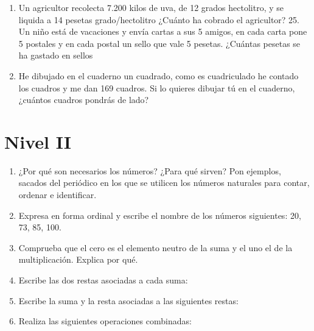 \documentclass[twoside]{article}
\begin{document}
\begin{enumerate}
\item Un agricultor recolecta 7.200 kilos de uva, de 12 grados hectolitro, y se liquida a 14 pesetas grado/hectolitro ¿Cuánto ha cobrado el agricultor? 25. Un niño está de vacaciones y envía cartas a sus 5 amigos, en cada carta pone 5 postales y en cada postal un sello que vale 5 pesetas. ¿Cuántas pesetas se ha gastado en sellos
\item He dibujado en el cuaderno un cuadrado, como es cuadriculado he contado los cuadros y me dan 169 cuadros. Si lo quieres dibujar tú en el cuaderno, ¿cuántos cuadros
pondrás de lado?
\end{enumerate}
\section*{Nivel II}
\begin{enumerate}
\item ¿Por qué son necesarios los números? ¿Para qué sirven? Pon ejemplos, sacados del periódico en los que se utilicen los números naturales para contar, ordenar e identificar.
\item Expresa en forma ordinal y escribe el nombre de los números siguientes: 20, 73, 85, 100.
\item Comprueba que el cero es el elemento neutro de la suma y el uno el de la multiplicación. Explica por qué.
\item Escribe las dos restas asociadas a cada suma:
\begin{enumerate}
\end{enumerate}
\item Escribe la suma y la resta asociadas a las siguientes restas:
\begin{enumerate}
\end{enumerate}
\item Realiza las siguientes operaciones combinadas:

\end{enumerate}
\end{document}
